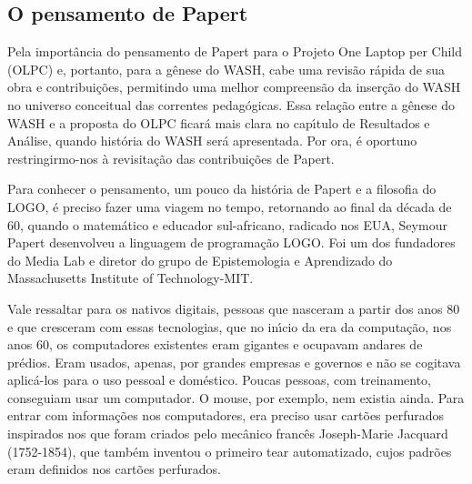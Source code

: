 \documentclass[
12pt,		%
openright,	%
twoside,  %
a4paper,			%
chapter=TITLE,		%
english,			%
french,				%
spanish,			%
brazil				%
]{USPSC-classe/USPSC}
\begin{document}
\subsection[O pensamento de Papert]{O pensamento de Papert}\label{O pensamento de Papert}
Pela import\^ancia do pensamento de Papert para o Projeto One Laptop per Child (OLPC) e, portanto, para a g\^enese do WASH, cabe uma revis\~ao r\'apida de sua obra e contribui\c{c}\~oes, permitindo uma melhor compreens\~ao da inser\c{c}\~ao do WASH no universo conceitual das correntes pedag\'ogicas. Essa rela\c{c}\~ao entre a g\^enese do WASH e a proposta do OLPC ficar\'a mais clara no cap\'{\i}tulo de Resultados e An\'alise, quando hist\'oria do WASH ser\'a apresentada. Por ora, \'e oportuno restringirmo-nos \`a revisita\c{c}\~ao das contribui\c{c}\~oes de Papert.














Para conhecer  o pensamento, um pouco da hist\'oria de Papert e  a filosofia do LOGO, \'e preciso fazer uma viagem no tempo, retornando ao final da d\'ecada de 60, quando o matem\'atico e educador sul-africano, radicado nos EUA, Seymour Papert desenvolveu a linguagem   de programa\c{c}\~ao LOGO.  Foi um dos fundadores do Media Lab e diretor do grupo de Epistemologia e Aprendizado do Massachusetts Institute of Technology-MIT.














Vale ressaltar para os nativos digitais, pessoas que nasceram a partir dos anos 80 e que cresceram com essas tecnologias, que no in\'{\i}cio da era da computa\c{c}\~ao, nos anos 60, os computadores existentes eram gigantes e ocupavam andares de pr\'edios. Eram usados, apenas, por grandes empresas e governos e n\~ao se cogitava aplic\'a-los para o uso pessoal e dom\'estico. Poucas pessoas, com treinamento, conseguiam usar um computador. O mouse, por exemplo, nem existia ainda. Para entrar com informa\c{c}\~oes nos computadores, era preciso usar cart\~oes perfurados inspirados nos que foram criados pelo mec\^anico franc\^es Joseph-Marie Jacquard (1752-1854), que tamb\'em inventou o primeiro tear automatizado, cujos padr\~oes eram definidos nos cart\~oes perfurados.
\end{document}
